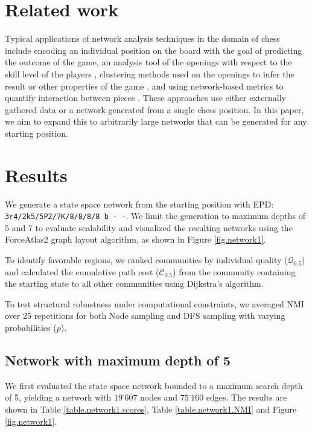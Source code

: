 \documentclass[9pt,twocolumn,twoside]{pnas-report}
\begin{document}
\section*{Related work}

Typical applications of network analysis techniques in the domain of chess include encoding an individual position on the board \cite{chess} with the goal of predicting the outcome of the game, an analysis tool of the openings with respect to the skill level of the players \cite{chess3}, clustering methods used on the openings to infer the result or other properties of the game \cite{chess2}, and using network-based metrics to quantify interaction between pieces \cite{chess4}. These approaches use either externally gathered data or a network generated from a single chess position. In this paper, we aim to expand this to arbitrarily large networks that can be generated for any starting position. 

\section*{Results}
We generate a state space network from the starting position with EPD: \texttt{3r4/2k5/5P2/7K/8/8/8/8 b - -}. We limit the generation to maximum depths of 5 and 7 to evaluate scalability and visualized the resulting networks using the ForceAtlas2 \cite{atlas} graph layout algorithm, as shown in Figure \ref{fig.network1}.

To identify favorable regions, we ranked communities by individual quality ($\mathcal{Q}_{0.5}$) and calculated the cumulative path cost ($\mathcal{C}_{0.5}$) from the community containing the starting state to all other communities using Dijkstra's algorithm.

To test structural robustness under computational constraints, we averaged NMI over 25 repetitions for both Node sampling and DFS sampling with varying probabilities ($p$).

\subsection{Network with maximum depth of 5}
We first evaluated the state space network bounded to a maximum search depth of 5, yielding a network with $19 ^\cdot 607$ nodes and $75 ^\cdot 160$ edges. The results are shown in Table \ref{table.network1.scores}, Table \ref{table.network1.NMI} and Figure \ref{fig.network1}.
\end{document}
